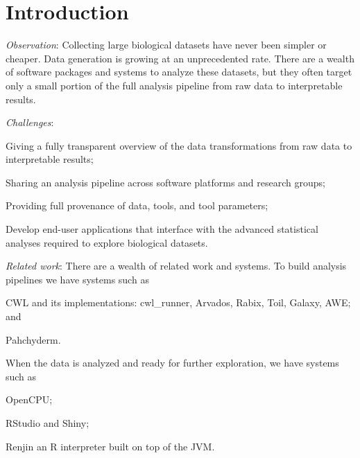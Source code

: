 
\chapter{Introduction}

% 

\emph{Observation}:
Collecting large biological datasets have never been simpler
or cheaper. Data generation is growing at an unprecedented rate. There are a
wealth of software packages and systems to analyze these datasets, but they
often target only a small portion of the full analysis pipeline from raw data to
interpretable results.

\emph{Challenges}:
\begin{enumerate*}[label=(\roman*)]
    \item Giving a fully transparent overview of the data transformations from
        raw data to interpretable results; 
    \item Sharing an analysis pipeline across software platforms and research
        groups; 
    \item Providing full provenance of data, tools, and tool parameters; 
    \item Develop end-user applications that interface with the advanced
        statistical analyses required to explore biological datasets.  
    
\end{enumerate*} 

\emph{Related work}:
There are a wealth of related work and systems. To build analysis pipelines we
have systems such as
\begin{enumerate*}[label=(\roman*)]
    \item CWL and its implementations: cwl\_runner, Arvados, Rabix, Toil, Galaxy,
        AWE; and 
    \item Pahchyderm. 
\end{enumerate*}
When the data is analyzed and ready for further exploration, we have systems
such as
\begin{enumerate*}[label=(\roman*)]
    \item OpenCPU;
    \item RStudio and Shiny; 
    \item Renjin an R interpreter built on top of the JVM. 
\end{enumerate*}
 

